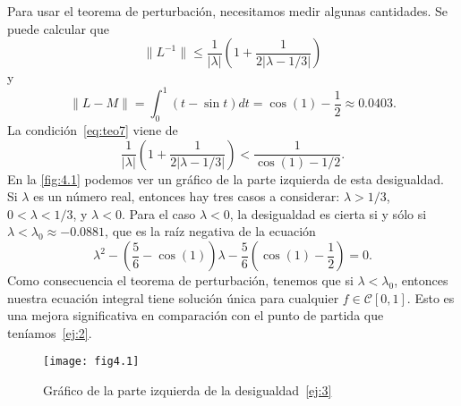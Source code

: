\begin{ejemplo}
	Para usar el teorema de perturbación, necesitamos medir algunas cantidades. Se puede calcular que
	\begin{equation}
		\lVert L^{-1} \rVert \leqslant \dfrac{1}{|\lambda|}(1 + \dfrac{1}{2|\lambda - 1/3|})
	\end{equation}
	y
	\begin{equation}
		\lVert L-M \rVert = \int_{0}^{1} (t - \sin t)dt = \cos(1) - \dfrac{1}{2} \approx 0.0403.
	\end{equation}
	La condición~\eqref{eq:teo7} viene de
	\begin{equation}\label{ej:3}
		\dfrac{1}{|\lambda|}(1+\dfrac{1}{2|\lambda - 1/3|}) < \dfrac{1}{\cos(1)-1/2}.
	\end{equation}
	En la \autoref{fig:4.1} podemos ver un gráfico de la parte izquierda de esta desigualdad. Si $\lambda$ es un número real, entonces hay tres casos a considerar: $\lambda > 1/3$, $0 < \lambda < 1/3$, y $\lambda < 0$. Para el caso $\lambda < 0$, la desigualdad es cierta si y sólo si $\lambda < \lambda_0 \approx -0.0881$, que es la raíz negativa de la ecuación
	\begin{equation}
		\lambda^2 - (\dfrac{5}{6} - \cos(1)) \lambda - \dfrac{5}{6}(\cos(1) - \dfrac{1}{2}) = 0.
	\end{equation} 
	Como consecuencia el teorema de perturbación, tenemos que si $\lambda < \lambda_0$, entonces nuestra ecuación integral tiene solución única para cualquier $f \in \mathcal{C}[0,1]$. Esto es una mejora significativa en comparación con el punto de partida que teníamos~\eqref{ej:2}.
\end{ejemplo}
\begin{figure}[htb!]
	\centering
	\texttt{[image: fig4.1]}
	\caption{Gráfico de la parte izquierda de la desigualdad~\eqref{ej:3}}
	\label{fig:4.1}
\end{figure}

\endinput
